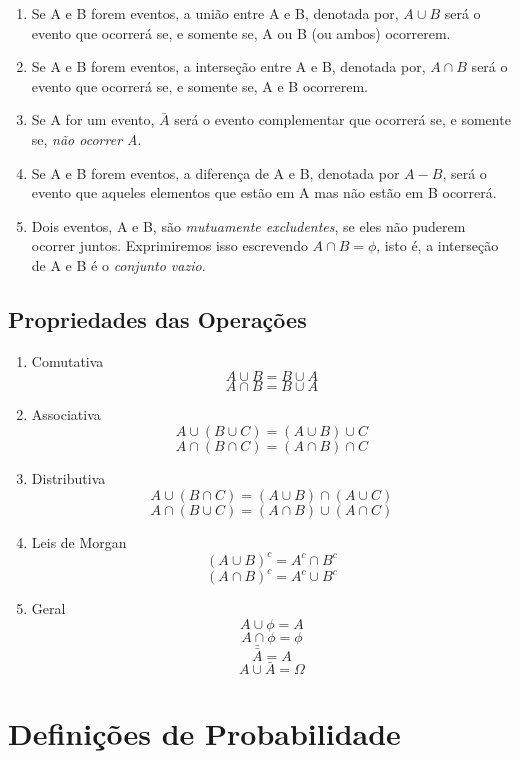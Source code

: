 \begin{enumerate}
    \item Se A e B forem eventos, a união entre A e B, denotada por, $A \cup B$ será o evento que
    ocorrerá se, e somente se, A ou B (ou ambos) ocorrerem.
    \item Se A e B forem eventos, a interseção entre A e B, denotada por, $A \cap B$ será o evento que
    ocorrerá se, e somente se, A e B ocorrerem.
    \item Se A for um evento, $\bar{A}$ será o evento complementar que ocorrerá
    se, e somente se, \emph{não ocorrer A}.
    \item Se A e B forem eventos, a diferença de A e B, denotada
    por $A-B$, será o evento que aqueles elementos que estão em A mas
    não estão em B ocorrerá.
    \item Dois eventos, A e B, são \emph{mutuamente excludentes}, se eles
    não puderem ocorrer juntos. Exprimiremos isso escrevendo $A \cap B =
    \phi$, isto é, a interseção de A e B é o \emph{conjunto vazio}.
\end{enumerate}



\subsection{Propriedades das Operações}

\begin{enumerate}
    \item Comutativa
$$A \cup B = B \cup A$$
$$A \cap B = B \cup A$$
    \item Associativa
$$A \cup (B \cup C) = (A \cup B)\cup C$$
$$A \cap (B \cap C) = (A \cap B)\cap C$$
    \item Distributiva
$$A \cup (B \cap C) = (A \cup B)\cap (A \cup C)$$
$$A \cap (B \cup C) = (A \cap B)\cup (A \cap C)$$
    \item Leis de Morgan
$$ (A \cup B)^{c}= A^{c} \cap B^{c}$$
$$ (A \cap B)^{c}= A^{c} \cup B^{c}$$
\item Geral
$$ A \cup \phi = A$$
$$ A \cap \phi = \phi$$
$$ \bar{\bar{A}}=A $$
$$ A \cup \bar{A}= \Omega $$
\end{enumerate}












 
\section{Definições de Probabilidade}
 
